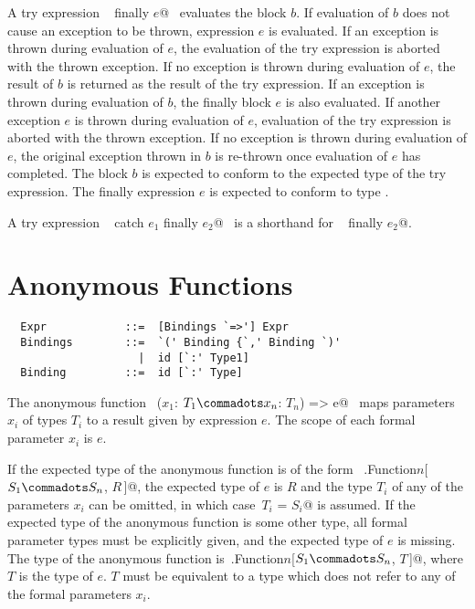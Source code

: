 \documentclass[a4paper,12pt,twoside,titlepage]{book}
\begin{document}
A try expression ~ finally $e$@~ evaluates the block
$b$.  If evaluation of $b$ does not cause an exception to be
thrown, expression $e$ is evaluated. If an exception is thrown
during evaluation of $e$, the evaluation of the try expression is
aborted with the thrown exception. If no exception is thrown during
evaluation of $e$, the result of $b$ is returned as the
result of the try expression. If an exception is thrown during
evaluation of $b$, the finally block
$e$ is also evaluated. If another exception $e$ is thrown
during evaluation of $e$, evaluation of the try expression is
aborted with the thrown exception. If no exception is thrown during
evaluation of $e$, the original exception thrown in $b$ is
re-thrown once evaluation of $e$ has completed.  The block
$b$ is expected to conform to the expected type of the try
expression. The finally expression $e$ is expected to conform to
type .

A try expression ~ catch $e_1$ finally $e_2$@~ is a shorthand
for  ~ finally $e_2$@.




\section{Anonymous Functions}
\label{sec:closures}

\syntax\begin{lstlisting}
  Expr            ::=  [Bindings `=>'] Expr
  Bindings        ::=  `(' Binding {`,' Binding `)'
                    |  id [`:' Type1]
  Binding         ::=  id [`:' Type]
\end{lstlisting}

The anonymous function ~\lstinline@($x_1$: $T_1 \commadots x_n$: $T_n$) => e@~ 
maps parameters $x_i$ of types $T_i$ to a result given
by expression $e$. The scope of each formal parameter
$x_i$ is $e$.

If the expected type of the anonymous function is of the form
~\lstinline@scala.Function$n$[$S_1 \commadots S_n$, $R\,$]@, the
expected type of $e$ is $R$ and the type $T_i$ of any of the
parameters $x_i$ can be omitted, in which
case~\lstinline@$T_i$ = $S_i$@ is assumed.
If the expected type of the anonymous function is
some other type, all formal parameter types must be explicitly given,
and the expected type of $e$ is missing. The type of the anonymous
function
is~\lstinline@scala.Function$n$[$S_1 \commadots S_n$, $T\,$]@,
where $T$ is the type of $e$. $T$ must be equivalent to a
type which does not refer to any of the formal parameters $x_i$.
\end{document}
